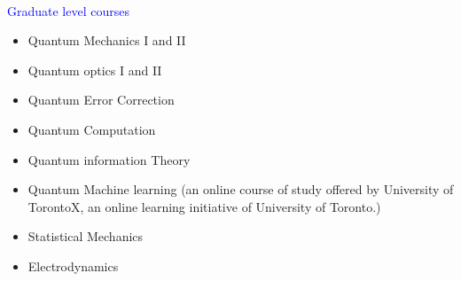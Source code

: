 \documentclass[14pt]{moderncv}
\begin{document}
\vspace{.2cm}
\\

\begin{minipage}{\textwidth} 

\textcolor{blue}{Graduate level courses}
\begin{itemize}
    \item Quantum Mechanics I and II 
    \item Quantum optics I and II
    \item Quantum Error Correction
    \item Quantum Computation
    \item Quantum information Theory
    \item Quantum Machine learning (an online course of study offered by University of TorontoX, an online learning initiative of University of Toronto.)
    \item Statistical Mechanics
    \item Electrodynamics
\end{itemize}


\end{minipage}
\end{document}
